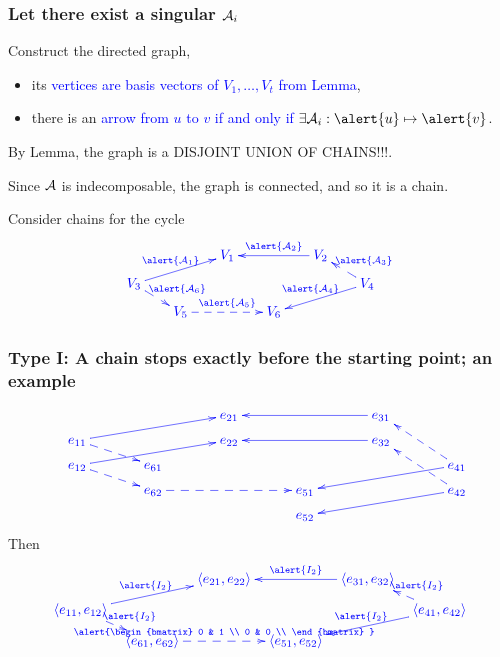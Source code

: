 \documentclass[usenames,dvipsnames]{beamer}
\begin{document}
\begin{frame}
\frametitle{Let there exist a singular ${\cal
A}_i$}

Construct the \alert{directed graph},
\begin{itemize}
  \item its
      \textcolor{blue}{vertices are
      basis vectors of
      $V_1,\dots,V_t$ from Lemma},
  \item there is an
      \textcolor{blue}{arrow from
      \alert{$u$} to \alert{$v$} if
      and only if $\exists{\cal
      A}_i:\alert{u}\mapsto\alert{v}$}.
\end{itemize}
\bigskip

By Lemma, the graph is a \alert{DISJOINT UNION OF CHAINS!!!}.

Since ${\cal{A}}$ is indecomposable,
the graph is connected, and so
\alert{it is a chain}.
\bigskip

Consider chains for the cycle
\[
\textcolor{blue}{\xymatrix@R=6pt@C=17pt{
&&V_1\ar@{<-}[rr]^{\alert{{\cal
      A}_2}}&&
V_2\ar@{<--}[dr]^{\alert{{\cal
      A}_3}}&\\
V_3\ar@{->}[urr]^{\alert{{\cal
      A}_1}}&&&&&
V_4\ar@{->}[dll]_{\alert{{\cal
      A}_4}}\\
& V_5\ar@{<--}[ul]_{\alert{{\cal
      A}_6}}&&
 V_6\ar@{<--}[ll]_{\alert{{\cal
      A}_5}}&&\\}}
\]


\end{frame}

\begin{frame}
\frametitle{Type I: A chain stops
exactly before the starting point; an
example}\vspace{-1cm}

\[\quad
\textcolor{blue}{\xymatrix@R=6pt@C=35pt{
&&e_{21}\ar@{<-}[rr]&&e_{31}
\ar@{<--}[ddr]&\\
e_{11}\ar@{->}[rru]&&e_{22}
\ar@{<-}[rr]&&e_{32}
\ar@{<--}[ddr]&\\
e_{12}\ar@{->}[urr]&e_{61}
\ar@{<--}[ul]
&&&&
e_{41}\ar@{->}[dll]\\
&e_{62}\ar@{<--}[ul]&&
e_{51}\ar@{<--}[ll]&&e_{42}
\ar@{->}[dll]\\
&&&e_{52}\\}}
\]
Then
\[
\textcolor{blue}{\xymatrix@R=6pt@C=7pt{
&&\langle e_{21}, e_{22}\rangle\ar@{<-}[rr]^{\alert{I_2}}&&
\langle e_{31}, e_{32}\rangle\ar@{<--}[dr]^{\alert{I_2}}&\\
\langle e_{11}, e_{12}\rangle\ar@{->}[urr]^{\alert{I_2}}&&&&&
\langle e_{41}, e_{42}\rangle\ar@{->}[dll]_{\alert{I_2}}\\
&\langle e_{61}, e_{62}\rangle\ar@{<--}[ul]_{\alert{I_2}}&&
\langle e_{51}, e_{52}\rangle\ar@{<--}[ll]_{
\alert{\begin{bmatrix}
               0 & 1 \\
               0 & 0 \\
             \end{bmatrix}
}}&&\\}}
\]
\end{frame}
\end{document}

